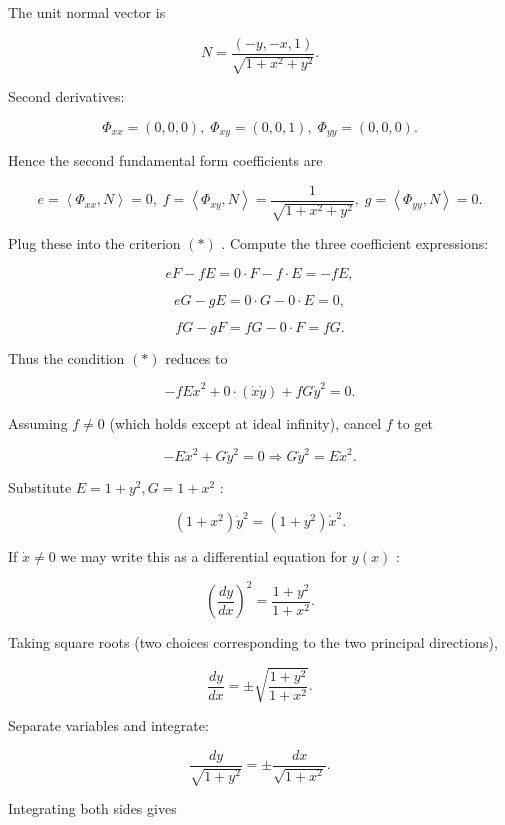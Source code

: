 \documentclass[10pt]{article}
\begin{document}
The unit normal vector is

\[
N = \frac{\left( -y, - x,1\right) }{\sqrt{1 + {x}^{2} + {y}^{2}}}.
\]

Second derivatives:

\[
{\Phi }_{xx} = \left( {0,0,0}\right) ,\;{\Phi }_{xy} = \left( {0,0,1}\right) ,\;{\Phi }_{yy} = \left( {0,0,0}\right) .
\]

Hence the second fundamental form coefficients are

\[
e = \left\langle  {{\Phi }_{xx},N}\right\rangle   = 0,\;f = \left\langle  {{\Phi }_{xy},N}\right\rangle   = \frac{1}{\sqrt{1 + {x}^{2} + {y}^{2}}},\;g = \left\langle  {{\Phi }_{yy},N}\right\rangle   = 0.
\]

Plug these into the criterion \(\left( *\right)\) . Compute the three coefficient expressions:

\[
{eF} - {fE} = 0 \cdot  F - f \cdot  E =  - {fE},
\]

\[
{eG} - {gE} = 0 \cdot  G - 0 \cdot  E = 0,
\]

\[
{fG} - {gF} = {fG} - 0 \cdot  F = {fG}.
\]

Thus the condition \(\left( *\right)\) reduces to

\[
- {fE}{\dot{x}}^{2} + 0 \cdot  \left( {\dot{x}\dot{y}}\right)  + {fG}{\dot{y}}^{2} = 0.
\]

Assuming \(f \neq  0\) (which holds except at ideal infinity), cancel \(f\) to get

\[
- E{\dot{x}}^{2} + G{\dot{y}}^{2} = 0 \Rightarrow  G{\dot{y}}^{2} = E{\dot{x}}^{2}.
\]

Substitute \(E = 1 + {y}^{2},G = 1 + {x}^{2}\) :

\[
\left( {1 + {x}^{2}}\right) {\dot{y}}^{2} = \left( {1 + {y}^{2}}\right) {\dot{x}}^{2}.
\]

If \(\dot{x} \neq  0\) we may write this as a differential equation for \(y\left( x\right)\) :

\[
{\left( \frac{dy}{dx}\right) }^{2} = \frac{1 + {y}^{2}}{1 + {x}^{2}}.
\]

Taking square roots (two choices corresponding to the two principal directions),

\[
\frac{dy}{dx} =  \pm  \sqrt{\frac{1 + {y}^{2}}{1 + {x}^{2}}}.
\]

Separate variables and integrate:

\[
\frac{dy}{\sqrt{1 + {y}^{2}}} =  \pm  \frac{dx}{\sqrt{1 + {x}^{2}}}.
\]

Integrating both sides gives
\end{document}
